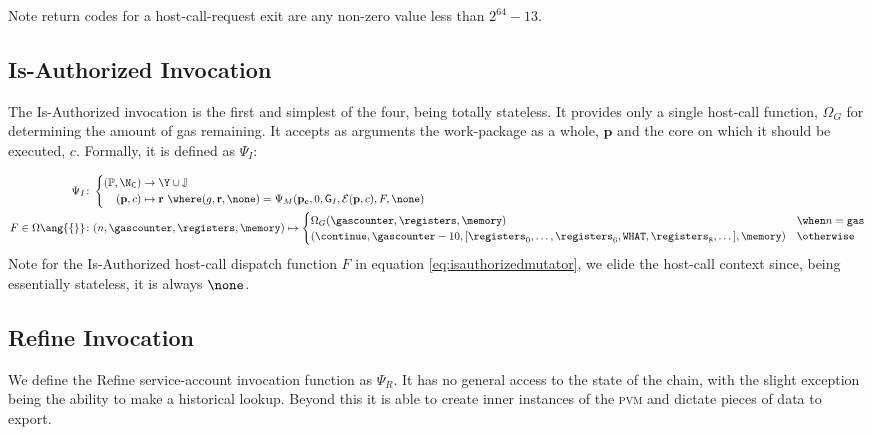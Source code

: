 Note return codes for a host-call-request exit are any non-zero value less than $2^{64} - 13$.

\subsection{Is-Authorized Invocation}\label{sec:isauthorizedinvocation}

The Is-Authorized invocation is the first and simplest of the four, being totally stateless. It provides only a single host-call function, $\Omega_G$ for determining the amount of gas remaining. It accepts as arguments the work-package as a whole, $\mathbf{p}$ and the core on which it should be executed, $c$. Formally, it is defined as $\Psi_I$:


\begin{align}
  \Psi_I &\colon \left\{\begin{aligned}
    (\mathbb{P}, \N_\mathsf{C}) &\to \Y \cup \mathbb{J} \\
    (\mathbf{p}, c) &\mapsto \mathbf{r}\ \where (g, \mathbf{r}, \none) = \Psi_M(\mathbf{p}_\mathbf{c}, 0, \mathsf{G}_I, \mathcal{E}(\mathbf{p}, c), F, \none)
  \end{aligned}\right. \\
  \label{eq:isauthorizedmutator}F \in \Omega\ang{\{\}} &\colon
    (n, \gascounter, \registers, \memory) \mapsto \begin{cases}
      \Omega_G(\gascounter, \registers, \memory) &\when n = \mathtt{gas} \\
      (\continue, \gascounter - 10, [\registers_0, \dots, \registers_6, \mathtt{WHAT}, \registers_8, \dots], \memory) &\otherwise
    \end{cases}
\end{align}
Note for the Is-Authorized host-call dispatch function $F$ in equation \ref{eq:isauthorizedmutator}, we elide the host-call context since, being essentially stateless, it is always $\none$.

\subsection{Refine Invocation}\label{sec:refineinvocation}

We define the Refine service-account invocation function as $\Psi_R$. It has no general access to the state of the \Jam chain, with the slight exception being the ability to make a historical lookup. Beyond this it is able to create inner instances of the \textsc{pvm} and dictate pieces of data to export.

